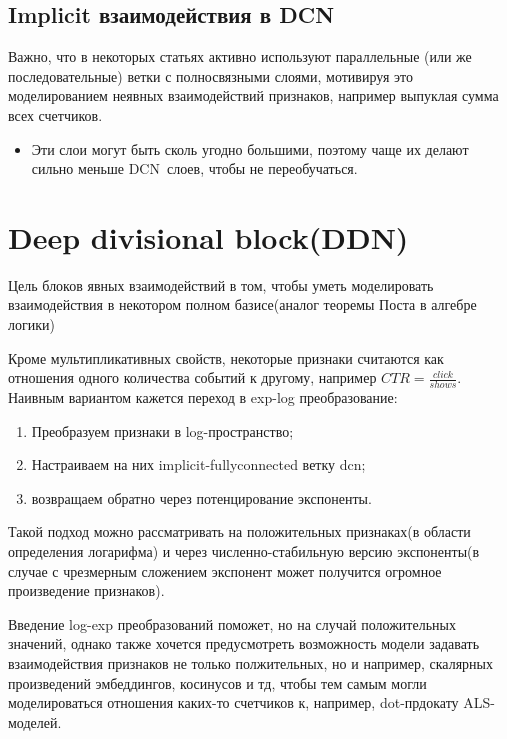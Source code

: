 \documentclass{report}
\begin{document}
\subsection{Implicit взаимодействия в DCN}
\label{dcn:intro:fullyconnected}

\par Важно, что в некоторых статьях\cite{DCN, DCNv3} активно используют параллельные
(или же последовательные) ветки с полносвязными слоями, мотивируя это \color{red} 
моделированием неявных взаимодействий признаков\color{black}, например выпуклая сумма всех счетчиков. 
\begin{itemize}
    \item Эти слои могут быть сколь угодно большими, поэтому чаще их делают сильно меньше \color{DCNcol}DCN\color{black}\ слоев, чтобы не переобучаться.
\end{itemize}

\section{Deep divisional block(DDN)}
\epigraph{Цель блоков явных взаимодействий в том, чтобы уметь моделировать взаимодействия в некотором полном базисе(аналог теоремы Поста в алгебре логики)}{}
\label{ddn:into}

\par Кроме мультипликативных свойств, некоторые признаки считаются как отношения 
одного количества событий к другому, например $CTR = \frac{click}{shows}$. Наивным вариантом кажется переход в \color{Plum}exp-log преобразование\color{black}:
\begin{enumerate}
    \item Преобразуем признаки в log-пространство;
    \item Настраиваем на них implicit-fullyconnected ветку dcn;
    \item возвращаем обратно через потенцирование экспоненты.
\end{enumerate}

\par Такой подход можно рассматривать \color{red}на положительных признаках\color{black}(в области определения логарифма) и 
через \color{red}численно-стабильную версию экспоненты\color{black}(в случае с чрезмерным сложением экспонент 
может получится огромное произведение признаков).

\par Введение log-exp преобразований поможет, но на случай \color{red}положительных значений\color{black}, 
однако также хочется предусмотреть возможность модели задавать взаимодействия признаков не 
только полжительных, но и например, скалярных произведений эмбеддингов, косинусов и тд, 
чтобы тем самым могли моделироваться отношения каких-то счетчиков к, 
например, dot-прдокату ALS-моделей.
\end{document}
